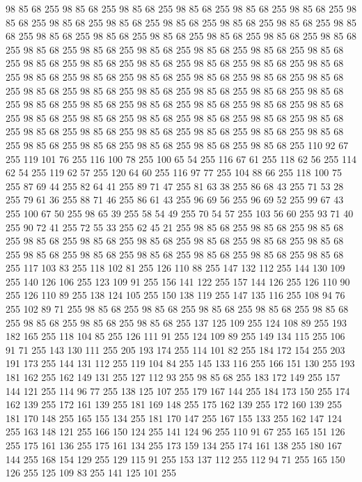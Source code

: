 98 85 68 255 98 85 68 255 98 85 68 255 98 85 68 255 98 85 68 255 98 85 68 255 98 85 68 255 98 85 68 255 98 85 68 255 98 85 68 255 98 85 68 255 98 85 68 255 98 85 68 255 98 85 68 255 98 85 68 255 98 85 68 255 98 85 68 255 98 85 68 255 98 85 68 255 98 85 68 255 98 85 68 255 98 85 68 255 98 85 68 255 98 85 68 255 98 85 68 255 98 85 68 255 98 85 68 255 98 85 68 255 98 85 68 255 98 85 68 255 98 85 68 255 98 85 68 255 98 85 68 255 98 85 68 255 98 85 68 255 98 85 68 255 98 85 68 255 98 85 68 255 98 85 68 255 98 85 68 255 98 85 68 255 98 85 68 255 98 85 68 255 98 85 68 255 98 85 68 255 98 85 68 255 98 85 68 255 98 85 68 255 98 85 68 255 98 85 68 255 98 85 68 255 98 85 68 255 98 85 68 255 98 85 68 255 98 85 68 255 98 85 68 255 98 85 68 255 98 85 68 255 98 85 68 255 98 85 68 255 98 85 68 255 98 85 68 255 98 85 68 255 98 85 68 255
98 85 68 255 98 85 68 255 110 92 67 255 119 101 76 255 116 100 78 255 100 65 54 255 116 67 61 255 118 62 56 255 114 62 54 255 119 62 57 255 120 64 60 255 116 97 77 255 104 88 66 255 118 100 75 255 87 69 44 255 82 64 41 255 89 71 47 255 81 63 38 255 86 68 43 255 71 53 28 255 79 61 36 255 88 71 46 255 86 61 43 255 96 69 56 255 96 69 52 255 99 67 43 255 100 67 50 255 98 65 39 255 58 54 49 255 70 54 57 255 103 56 60 255 93 71 40 255 90 72 41 255 72 55 33 255 62 45 21 255 98 85 68 255 98 85 68 255 98 85 68 255 98 85 68 255 98 85 68 255 98 85 68 255 98 85 68 255 98 85 68 255 98 85 68 255 98 85 68 255 98 85 68 255 98 85 68 255 98 85 68 255 98 85 68 255 98 85 68 255 117 103 83 255 118 102 81 255 126 110 88 255 147 132 112 255 144 130 109 255 140 126 106 255 123 109 91 255 156 141 122 255 157 144 126 255 126 110 90 255 126 110 89 255 138 124 105 255 150 138 119 255 147 135 116 255
108 94 76 255 102 89 71 255 98 85 68 255 98 85 68 255 98 85 68 255 98 85 68 255 98 85 68 255 98 85 68 255 98 85 68 255 98 85 68 255 137 125 109 255 124 108 89 255 193 182 165 255 118 104 85 255 126 111 91 255 124 109 89 255 149 134 115 255 106 91 71 255 143 130 111 255 205 193 174 255 114 101 82 255 184 172 154 255 203 191 173 255 144 131 112 255 119 104 84 255 145 133 116 255 166 151 130 255 193 181 162 255 162 149 131 255 127 112 93 255 98 85 68 255 183 172 149 255 157 144 121 255 114 96 77 255 138 125 107 255 179 167 144 255 184 173 150 255 174 162 139 255 172 161 139 255 181 169 148 255 175 162 139 255 172 160 139 255 181 170 148 255 165 155 134 255 181 170 147 255 167 155 133 255 162 147 124 255 163 148 121 255 166 150 124 255 141 124 96 255 110 91 67 255 165 151 126 255 175 161 136 255 175 161 134 255 173 159 134 255 174 161 138 255 180 167 144 255 168 154 129 255 129 115 91 255 153 137 112 255 112 94 71 255 165 150 126 255 125 109 83 255 141 125 101 255
